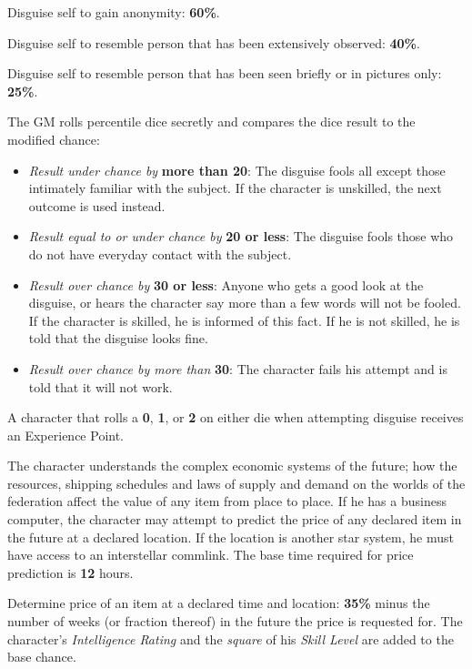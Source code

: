 \begin{tasklist}
\item Disguise self to gain anonymity: \textbf{60\%}.
\item Disguise self to resemble person that has been extensively
  observed: \textbf{40\%}.
\item Disguise self to resemble person that has been seen briefly or
  in pictures only: \textbf{25\%}.
\end{tasklist}

The GM rolls percentile dice secretly and compares the dice result to
the modified chance:

\begin{itemize}
\item \emph{Result under chance by} \textbf{more than 20}: The
  disguise fools all except those intimately familiar with the
  subject.  If the character is unskilled, the next outcome is used
  instead.
\item \emph{Result equal to or under chance by} \textbf{20 or less}:
  The disguise fools those who do not have everyday contact with the
  subject.
\item \emph{Result over chance by} \textbf{30 or less}: Anyone who
  gets a good look at the disguise, or hears the character say more
  than a few words will not be fooled.  If the character is skilled, he
  is informed of this fact.  If he is not skilled, he is told that the
  disguise looks fine.
\item \emph{Result over chance by more than} \textbf{30}: The character fails
  his attempt and is told that it will not work.
\end{itemize}

A character that rolls a \textbf{0}, \textbf{1}, or \textbf{2} on
either die when attempting disguise receives an Experience Point.

\label{sec:skill-economics}

The character understands the complex economic systems of the future;
how the resources, shipping schedules and laws of supply and demand on
the worlds of the federation affect the value of any item from place
to place.  If he has a business computer, the character may attempt to
predict the price of any declared item in the future at a declared
location.  If the location is another star system, he must have access
to an interstellar commlink.  The base time required for price
prediction is \textbf{12} hours.

\begin{tasklist}
\item Determine price of an item at a declared time and location:
  \textbf{35\%} minus the number of weeks (or fraction thereof) in the
  future the price is requested for.  The character's
  \emph{Intelligence Rating} and the \emph{square} of his \emph{Skill
    Level} are added to the base chance.
\end{tasklist}


